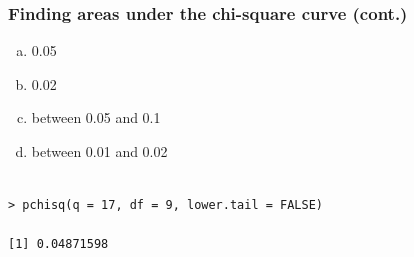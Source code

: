 \documentclass[notes,11pt, aspectratio=169]{beamer}
\begin{document}

\begin{frame}[fragile]
\frametitle{Finding areas under the chi-square curve (cont.)}


{
{\small
\begin{enumerate}[(a)]
\setlength{\itemsep}{0in}
\item 0.05
\item 0.02
\item between 0.05 and 0.1
\item between 0.01 and 0.02
\end{enumerate}
}
}

\pause

\begin{verbatim}

> pchisq(q = 17, df = 9, lower.tail = FALSE)

[1] 0.04871598

\end{verbatim}

\end{frame}

\end{document}
